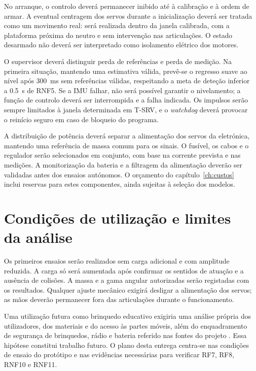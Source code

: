 No arranque, o controlo deverá permanecer inibido até à calibração e à ordem de armar. A eventual centragem dos servos durante a inicialização deverá ser tratada como um movimento real: será realizada dentro da janela calibrada, com a plataforma próxima do neutro e sem intervenção nas articulações. O estado desarmado não deverá ser interpretado como isolamento elétrico dos motores.

O supervisor deverá distinguir perda de referências e perda de medição. Na primeira situação, mantendo uma estimativa válida, prevê-se o regresso suave ao nível após \SI{300}{\milli\second} sem referências válidas, respeitando a meta de deteção inferior a \SI{0.5}{\second} de RNF5. Se a IMU falhar, não será possível garantir o nivelamento; a função de controlo deverá ser interrompida e a falha indicada. Os impulsos serão sempre limitados à janela determinada em T-SRV, e o \textit{watchdog} deverá provocar o reinício seguro em caso de bloqueio do programa.

A distribuição de potência deverá separar a alimentação dos servos da eletrónica, mantendo uma referência de massa comum para os sinais. O fusível, os cabos e o regulador serão selecionados em conjunto, com base na corrente prevista e nas medições. A monitorização da bateria e a filtragem da alimentação deverão ser validadas antes dos ensaios autónomos. O orçamento do capítulo~\ref{ch:custos} inclui reservas para estes componentes, ainda sujeitas à seleção dos modelos.

\section{Condições de utilização e limites da análise}
Os primeiros ensaios serão realizados sem carga adicional e com amplitude reduzida. A carga só será aumentada após confirmar os sentidos de atuação e a ausência de colisões. A massa e a gama angular autorizadas serão registadas com os resultados. Qualquer ajuste mecânico exigirá desligar a alimentação dos servos; as mãos deverão permanecer fora das articulações durante o funcionamento.

Uma utilização futura como brinquedo educativo exigiria uma análise própria dos utilizadores, dos materiais e do acesso às partes móveis, além do enquadramento de segurança de brinquedos, rádio e bateria referido nas fontes do projeto \cite{toy2009,red2014,battery2023}. Essa hipótese constitui trabalho futuro. O plano desta entrega centra-se nas condições de ensaio do protótipo e nas evidências necessárias para verificar RF7, RF8, RNF10 e RNF11.
